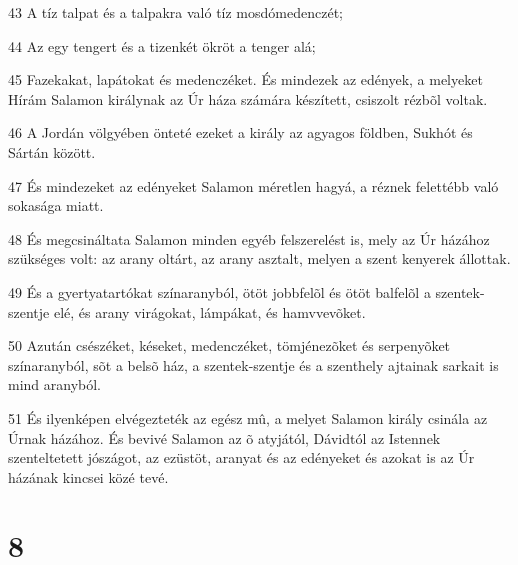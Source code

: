 \par 43 A tíz talpat és a talpakra való tíz mosdómedenczét;
\par 44 Az egy tengert és a tizenkét ökröt a tenger alá;
\par 45 Fazekakat, lapátokat és medenczéket. És mindezek az edények, a melyeket Hírám Salamon királynak az Úr háza számára készített, csiszolt rézbõl voltak.
\par 46 A Jordán völgyében önteté ezeket a király az agyagos földben, Sukhót és Sártán között.
\par 47 És mindezeket az edényeket Salamon méretlen hagyá, a réznek felettébb való sokasága miatt.
\par 48 És megcsináltata Salamon minden egyéb felszerelést is, mely az Úr házához szükséges volt: az arany oltárt, az arany asztalt, melyen  a szent kenyerek állottak.
\par 49 És a gyertyatartókat színaranyból, ötöt jobbfelõl és ötöt balfelõl a szentek-szentje elé, és arany virágokat, lámpákat, és hamvvevõket.
\par 50 Azután csészéket, késeket, medenczéket, tömjénezõket és serpenyõket színaranyból, sõt a belsõ ház, a szentek-szentje és a szenthely ajtainak sarkait is mind aranyból.
\par 51 És ilyenképen elvégezteték az egész mû, a melyet Salamon király csinála az Úrnak házához. És bevivé Salamon az õ atyjától, Dávidtól az Istennek szenteltetett jószágot, az ezüstöt, aranyat és az edényeket és azokat is az Úr házának kincsei közé tevé.

\chapter{8}

